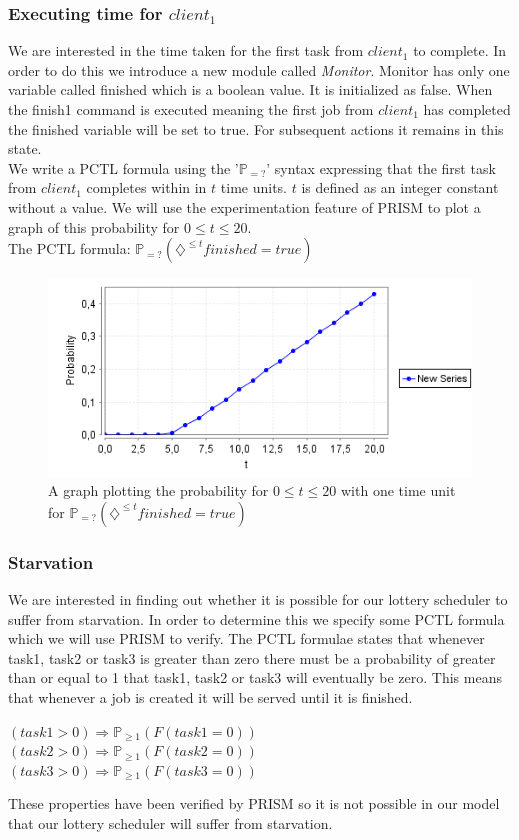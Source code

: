 \documentclass[12pt]{report}
\begin{document}
\subsubsection*{Executing time for $client_1$}
We are interested in the time taken for the first task from $client_1$ to complete. In order to do this we introduce a new module called \emph{Monitor}. Monitor has only one variable called finished which is a boolean value. It is initialized as false. When the finish1 command is executed meaning the first job from $client_1$ has completed the finished variable will be set to true. For subsequent actions it remains in this state.\\
We write a PCTL formula using the '$\mathbb{P}_{=?}$' syntax expressing that the first task from $client_1$ completes within in $t$ time units. $t$ is defined as an integer constant without a value. We will use the experimentation feature of PRISM to plot a graph of this probability for $0 \leq t \leq 20$.\\
The PCTL formula: $\mathbb{P}_{=?}(\diamondsuit^{\leq t} finished=true)$
\begin{figure}[H]
	\centering
	\includegraphics[scale=0.75]{../GFX/B1-1c.png}
	\caption{A graph plotting the probability for $0 \leq t \leq 20$ with one time unit for $\mathbb{P}_{=?}(\diamondsuit^{\leq t} finished=true)$}
\end{figure}

\subsubsection*{Starvation}
We are interested in finding out whether it is possible for our lottery scheduler to suffer from starvation. In order to determine this we specify some PCTL formula which we will use PRISM to verify. The PCTL formulae states that whenever task1, task2 or task3 is greater than zero there must be a probability of greater than or equal to 1 that task1, task2 or task3 will eventually be zero. This means that whenever a job is created it will be served until it is finished.
\begin{center}
$(task1 > 0) \Rightarrow \mathbb{P}_{\geq 1}(F(task1 = 0))$\\
$(task2 > 0) \Rightarrow \mathbb{P}_{\geq 1}(F(task2 = 0))$\\
$(task3 > 0) \Rightarrow \mathbb{P}_{\geq 1} (F(task3 = 0))$
\end{center}
These properties have been verified by PRISM so it is not possible in our model that our lottery scheduler will suffer from starvation.
\end{document}

